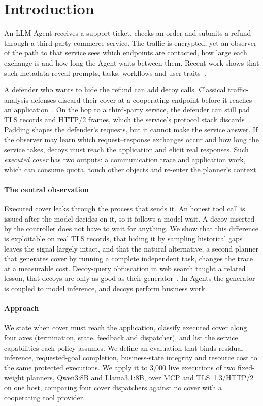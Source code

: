\section{Introduction}\label{sec:intro}
An LLM Agent receives a support ticket, checks an order and submits a refund through a third-party commerce service. The traffic is encrypted, yet an observer of the path to that service sees which endpoints are contacted, how large each exchange is and how long the Agent waits between them. Recent work shows that such metadata reveal prompts, tasks, workflows and user traits~\cite{jeong2026wra,dangol2026workflow,pouryousef2026traffic,li2026ant}.

A defender who wants to hide the refund can add decoy calls. Classical traffic-analysis defenses discard their cover at a cooperating endpoint before it reaches an application~\cite{apthorpe2019stp}. On the hop to a third-party service, the defender can still pad TLS records and HTTP/2 frames, which the service's protocol stack discards~\cite{rfc8446,rfc9113}. Padding shapes the defender's requests, but it cannot make the service answer. If the observer may learn which request--response exchanges occur and how long the service takes, decoys must reach the application and elicit real responses. Such \emph{executed cover} has two outputs: a communication trace and application work, which can consume quota, touch other objects and re-enter the planner's context.

\paragraph{The central observation}
Executed cover leaks through the process that sends it. An honest tool call is issued after the model decides on it, so it follows a model wait. A decoy inserted by the controller does not have to wait for anything. We show that this difference is exploitable on real TLS records, that hiding it by sampling historical gaps leaves the signal largely intact, and that the natural alternative, a second planner that generates cover by running a complete independent task, changes the trace at a measurable cost. Decoy-query obfuscation in web search taught a related lesson, that decoys are only as good as their generator~\cite{howe2008trackmenot,peddinti2010trackmenot,balsa2012obpws}. In Agents the generator is coupled to model inference, and decoys perform business work.



\paragraph{Approach}
We state when cover must reach the application, classify executed cover along four axes (termination, state, feedback and dispatcher), and list the service capabilities each policy assumes. We define an evaluation that binds residual inference, requested-goal completion, business-state integrity and resource cost to the same protected executions. We apply it to 3,000 live executions of two fixed-weight planners, Qwen3:8B and Llama3.1:8B, over MCP and TLS~1.3/HTTP/2 on one host, comparing four cover dispatchers against no cover with a cooperating tool provider.

